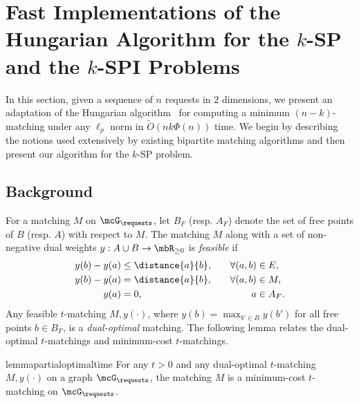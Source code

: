 \section{Fast Implementations of the Hungarian Algorithm for the \texorpdfstring{$k$}{-}-SP and the \texorpdfstring{$k$}{-}-SPI Problems}\label{sec:nk-algod}
In this section, given a sequence of $n$ requests in $2$ dimensions, we present an adaptation of the Hungarian algorithm~\cite{kuhn1955hungarian} for computing a minimum $(n-k)$-matching under any $\ell_p$ norm in $\tilde{O}(nk\Phi(n))$ time.  We begin by describing the notions used extensively by existing bipartite matching algorithms and then present our algorithm for the $k$-SP problem.


\subsection{Background}
For a matching $M$ on $\mcG_\requests$, let $B_F$ (resp. $A_F$) denote the set of free points of $B$ (resp. $A$) with respect to $M$. The matching $M$ along with a set of non-negative dual weights $y:A\cup B\rightarrow \mbR_{\ge0}$ is \emph{feasible} if 
\begin{align}
    y(b) - y(a) &\le \distance{a}{b},&  \quad \forall(a,b)&\in E,\label{eq:dualfeasibility-non-matching}\\
    y(b) - y(a) &= \distance{a}{b},& \quad \forall(a,b)&\in M,\label{eq:dualfeasibility-matching}\\
    y(a) &= 0,& \quad a&\in A_F.\label{eq:dualfeasibility-free_a-nk}
\end{align}
Any feasible $t$-matching $M, y(\cdot)$, where $y(b)=\max_{b'\in B} y(b')$ for all free points $b\in B_F$, is a \emph{dual-optimal} matching. 
The following lemma relates the dual-optimal $t$-matchings and minimum-cost $t$-matchings.

\begin{restatable}{lemma}{partialoptimaltime}\label{lemma:partial-optimal-time}
    For any $t>0$ and any dual-optimal $t$-matching $M, y(\cdot)$ on a graph $\mcG_\requests$, the matching $M$ is a minimum-cost $t$-matching on $\mcG_\requests$.
\end{restatable}


